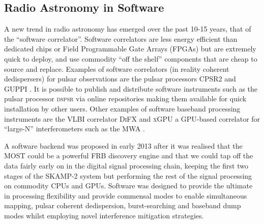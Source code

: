 \subsection{Radio Astronomy in Software}
A new trend in radio astronomy has emerged over the past 10-15 years, that of the ``software correlator''. Software correlators are less energy efficient than dedicated chips or Field Programmable Gate Arrays (FPGAs) but are extremely quick to deploy, and use commodity ``off the shelf'' components that are cheap to source and replace. Examples of software correlators (in reality coherent dedispersers) for pulsar observations are the pulsar processors CPSR2 \citep{Bailes_2009} and GUPPI \citep{DuPlain_2008}. It is possible to publish and distribute software instruments such as the pulsar processor \textsc{dspsr} \citep{van_Straten_2011} via online repositories making them available for quick installation by other users. Other examples of software baseband processing instruments are the VLBI correlator \textsc{DiFX} \citep{Deller_2007} 
 and \textsc{xGPU} \citep{Clark_2012} a GPU-based correlator for ``large-N'' interferometers such as the MWA \citep{Tingay_2013}. 

A software backend was proposed in early 2013 after it was realised that the MOST could be a powerful FRB discovery engine and that we could tap off the data fairly early on in the digital signal processing chain, keeping the first two stages of the SKAMP-2 system but performing the rest of the signal processing on commodity CPUs and GPUs. Software was designed to provide the ultimate in processing flexibility and provide commensal modes to enable simultaneous mapping, pulsar coherent dedispersion, burst-searching and baseband dump modes whilst employing novel interference mitigation strategies.
